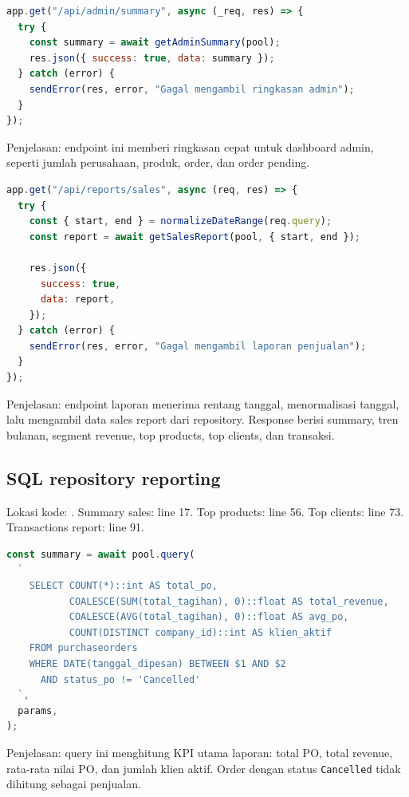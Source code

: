 \documentclass[11pt,a4paper]{article}
\begin{document}
\begin{lstlisting}[language=JavaScript]
app.get("/api/admin/summary", async (_req, res) => {
  try {
    const summary = await getAdminSummary(pool);
    res.json({ success: true, data: summary });
  } catch (error) {
    sendError(res, error, "Gagal mengambil ringkasan admin");
  }
});
\end{lstlisting}

Penjelasan: endpoint ini memberi ringkasan cepat untuk dashboard admin, seperti jumlah perusahaan, produk, order, dan order pending.

\begin{lstlisting}[language=JavaScript]
app.get("/api/reports/sales", async (req, res) => {
  try {
    const { start, end } = normalizeDateRange(req.query);
    const report = await getSalesReport(pool, { start, end });

    res.json({
      success: true,
      data: report,
    });
  } catch (error) {
    sendError(res, error, "Gagal mengambil laporan penjualan");
  }
});
\end{lstlisting}

Penjelasan: endpoint laporan menerima rentang tanggal, menormalisasi tanggal, lalu mengambil data sales report dari repository. Response berisi summary, tren bulanan, segment revenue, top products, top clients, dan transaksi.

\subsection*{SQL repository reporting}
Lokasi kode: . Summary sales: line 17. Top products: line 56. Top clients: line 73. Transactions report: line 91.

\begin{lstlisting}[language=JavaScript]
const summary = await pool.query(
  `
    SELECT COUNT(*)::int AS total_po,
           COALESCE(SUM(total_tagihan), 0)::float AS total_revenue,
           COALESCE(AVG(total_tagihan), 0)::float AS avg_po,
           COUNT(DISTINCT company_id)::int AS klien_aktif
    FROM purchaseorders
    WHERE DATE(tanggal_dipesan) BETWEEN $1 AND $2
      AND status_po != 'Cancelled'
  `,
  params,
);
\end{lstlisting}

Penjelasan: query ini menghitung KPI utama laporan: total PO, total revenue, rata-rata nilai PO, dan jumlah klien aktif. Order dengan status \texttt{Cancelled} tidak dihitung sebagai penjualan.
\end{document}
